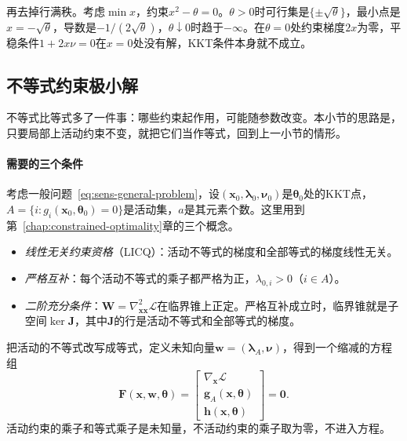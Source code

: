 再去掉行满秩。考虑$\min x$，约束$x^2-\theta=0$。$\theta>0$时可行集是$\{\pm\sqrt{\theta}\}$，最小点是$x=-\sqrt{\theta}$，导数是$-1/(2\sqrt{\theta})$，$\theta\downarrow0$时趋于$-\infty$。在$\theta=0$处约束梯度$2x$为零，平稳条件$1+2x\nu=0$在$x=0$处没有解，KKT条件本身就不成立。

\subsection{不等式约束极小解}
\label{sec:sens-inequality}

不等式比等式多了一件事：哪些约束起作用，可能随参数改变。本小节的思路是，只要局部上活动约束不变，就把它们当作等式，回到上一小节的情形。

\paragraph{需要的三个条件}
考虑一般问题~\eqref{eq:sens-general-problem}，设$(\bm{x}_0,\bm{\lambda}_0,\bm{\nu}_0)$是$\bm{\theta}_0$处的KKT点，$A=\{i:g_i(\bm{x}_0,\bm{\theta}_0)=0\}$是活动集，$a$是其元素个数。这里用到第~\ref{chap:constrained-optimality}章的三个概念。

\begin{itemize}
 \item \emph{线性无关约束资格}（LICQ）：活动不等式的梯度和全部等式的梯度线性无关。
 \item \emph{严格互补}：每个活动不等式的乘子都严格为正，$\lambda_{0,i}>0$（$i\in A$）。
 \item \emph{二阶充分条件}：$\bm{W}=\nabla^2_{\bm{x}\bm{x}}\mathcal{L}$在临界锥上正定。严格互补成立时，临界锥就是子空间$\ker\bm{J}$，其中$\bm{J}$的行是活动不等式和全部等式的梯度。
\end{itemize}

把活动的不等式改写成等式，定义未知向量$\bm{w}=(\bm{\lambda}_A,\bm{\nu})$，得到一个缩减的方程组
\begin{equation}
 \bm{F}(\bm{x},\bm{w},\bm{\theta})=\begin{bmatrix}\nabla_{\bm{x}}\mathcal{L}\\\bm{g}_A(\bm{x},\bm{\theta})\\\bm{h}(\bm{x},\bm{\theta})\end{bmatrix}=\bm{0}.
 \label{eq:sens-reduced-kkt}
\end{equation}
活动约束的乘子和等式乘子是未知量，不活动约束的乘子取为零，不进入方程。

